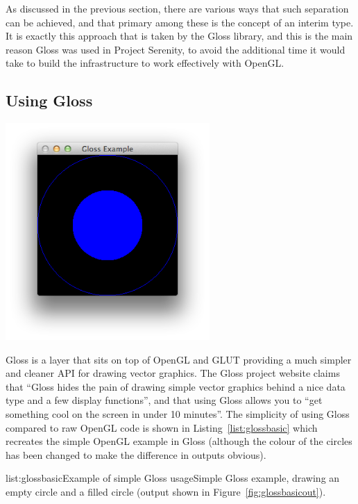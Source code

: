 As discussed in the previous section, there are various ways that such separation can be achieved, and that primary among these is the concept of an interim type. It is exactly this approach that is taken by the Gloss library, and this is the main reason Gloss was used in Project Serenity, to avoid the additional time it would take to build the infrastructure to work effectively with OpenGL.

\subsection{Using Gloss}

\begin{marginfigure}
	\hspace{-3em}\includegraphics[width=21em]{res/gloss/glossbasic.png}
	\caption[Output of example Gloss code in Listing~\ref{list:glossbasic}]{Output of example Gloss code in Listing~\ref{list:glossbasic}.}
	\label{fig:glossbasicout}
\end{marginfigure}

Gloss is a layer that sits on top of OpenGL and GLUT providing a much simpler and cleaner API for drawing vector graphics. The Gloss project website claims that ``Gloss hides the pain of drawing simple vector graphics behind a nice data type and a few display functions'', and that using Gloss allows you to ``get something cool on the screen in under 10 minutes''. The simplicity of using Gloss compared to raw OpenGL code is shown in Listing~\ref{list:glossbasic} which recreates the simple OpenGL example in Gloss (although the colour of the circles has been changed to make the difference in outputs obvious).

\vspace{-0.5em}
\begin{listing}{list:glossbasic}{Example of simple Gloss usage}{Simple Gloss example, drawing an empty circle and a filled circle (output shown in Figure~\ref{fig:glossbasicout}).}{}
\end{listing}\vspace{-1.5em}

